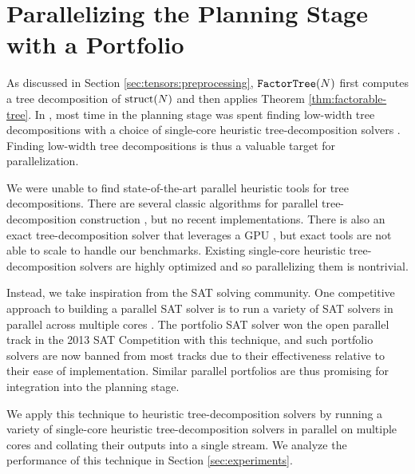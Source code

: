 \section{Parallelizing the Planning Stage with a Portfolio}
\label{sec:parallel:planning}
As discussed in Section \ref{sec:tensors:preprocessing}, $\texttt{\upshape FactorTree}(N)$ first computes a tree decomposition of $\text{struct}(N)$ and then applies Theorem \ref{thm:factorable-tree}. In \cite{DDV19}, most time in the planning stage was spent finding low-width tree decompositions with a choice of single-core heuristic tree-decomposition solvers \cite{AMW17,HS18,Tamaki17}. Finding low-width tree decompositions is thus a valuable target for parallelization.

We were unable to find state-of-the-art parallel heuristic tools for tree decompositions. There are several classic algorithms for parallel tree-decomposition construction \cite{Lagergren90,SWG13}, but no recent implementations. There is also an exact tree-decomposition solver that leverages a GPU \cite{VB17}, but exact tools are not able to scale to handle our benchmarks. Existing single-core heuristic tree-decomposition solvers are highly optimized and so parallelizing them is nontrivial.

Instead, we take inspiration from the SAT solving community. One competitive approach to building a parallel SAT solver is to run a variety of SAT solvers in parallel across multiple cores \cite{BSS15,MSSS13,XHHL08}. The portfolio SAT solver  \cite{MSSS13} won the open parallel track in the 2013 SAT Competition with this technique, and such portfolio solvers are now banned from most tracks due to their effectiveness relative to their ease of implementation. Similar parallel portfolios are thus promising for integration into the planning stage.

We apply this technique to heuristic tree-decomposition solvers by running a variety of single-core heuristic tree-decomposition solvers in parallel on multiple cores and collating their outputs into a single stream. We analyze the performance of this technique in Section \ref{sec:experiments}.

